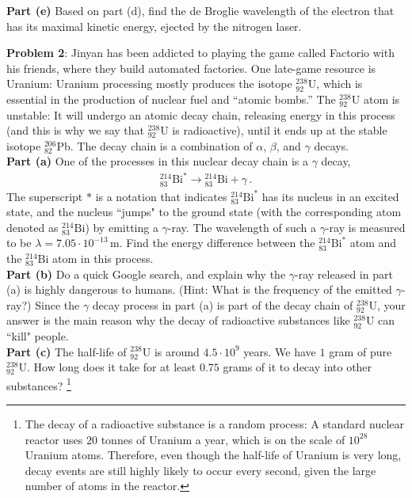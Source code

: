 \documentclass[11pt]{article}
\begin{document}
\noindent\textbf{Part (e)} Based on part (d), find the de Broglie wavelength of the electron that has its maximal kinetic energy, ejected by the nitrogen laser.

\newpage
\noindent \textbf{Problem 2}: Jinyan has been addicted to playing the game called Factorio with his friends, where they build automated factories. One late-game resource is Uranium: Uranium processing mostly produces the isotope $_{92}^{238}$U, which is essential in the production of nuclear fuel and “atomic bombs.” The $_{92}^{238}$U atom is unstable: It will undergo an atomic decay chain, releasing energy in this process (and this is why we say that $_{92}^{238}$U is radioactive), until it ends up at the stable isotope $^{206}_{82}$Pb. The decay chain is a combination of $\alpha$, $\beta$, and $\gamma$ decays. \\

\noindent\textbf{Part (a)} One of the processes in this nuclear decay chain is a $\gamma$ decay, 
\begin{align*}
^{214}_{83}\text{Bi}^* \to {}^{214}_{83}\text{Bi} + \gamma\,.
\end{align*}
The superscript $*$ is a notation that indicates $^{214}_{83}\text{Bi}^*$ has its nucleus in an excited state, and the nucleus ``jumps" to the ground state (with the corresponding atom denoted as ${}^{214}_{83}\text{Bi}$) by emitting a $\gamma$-ray. The wavelength of such a $\gamma$-ray is measured to be $\lambda = 7.05\cdot 10^{-13}\,\text{m}$. Find the energy difference between the $^{214}_{83}\text{Bi}^*$ atom and the ${}^{214}_{83}\text{Bi}$ atom in this process. \\

\noindent\textbf{Part (b)} Do a quick Google search, and explain why the $\gamma$-ray released in part (a) is highly dangerous to humans. (Hint: What is the frequency of the emitted $\gamma$-ray?) Since the $\gamma$ decay process in part (a) is part of the decay chain of $^{238}_{92}$U, your answer is the main reason why the decay of radioactive substances like $^{238}_{92}$U can ``kill" people. \\

\noindent\textbf{Part (c)} The half-life of $^{238}_{92}$U is around $4.5\cdot 10^9$ years. We have $1$ gram of pure $^{238}_{92}$U. How long does it take for at least $0.75$ grams of it to decay into other substances? \footnote{The decay of a radioactive substance is a random process: A standard nuclear reactor uses $20$ tonnes of Uranium a year, which is on the scale of $10^{28}$ Uranium atoms. Therefore, even though the half-life of Uranium is very long, decay events are still highly likely to occur every second, given the large number of atoms in the reactor.}\\
\end{document}
